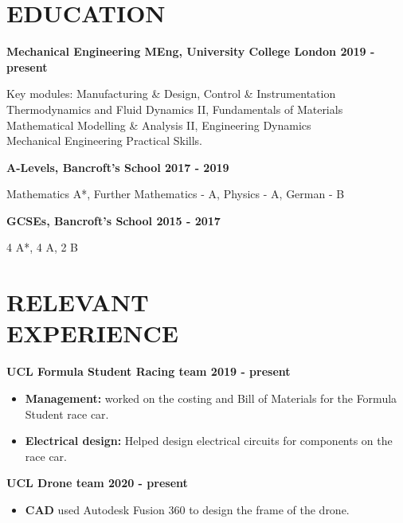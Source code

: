 \documentclass[margin, 10pt]{res} %
\begin{document}
\begin{resume}

 
\section{EDUCATION}  

\textbf{Mechanical Engineering MEng, University College London \hfill 2019 - present}

Key modules: Manufacturing \& Design, Control \& Instrumentation\\
Thermodynamics and Fluid Dynamics II, Fundamentals of Materials\\
Mathematical Modelling \& Analysis II, Engineering Dynamics\\
Mechanical Engineering Practical Skills.

\textbf{A-Levels, Bancroft's School \hfill 2017 - 2019}

Mathematics A*, Further Mathematics - A, Physics - A, German - B

\textbf{GCSEs, Bancroft's School
\hfill 2015 - 2017}

4 A*, 4 A, 2 B


\section{RELEVANT \\EXPERIENCE} 

\textbf{UCL Formula Student Racing team \hfill 2019 - present}
\\
\begin{itemize}
  \item \textbf{Management:} worked on the costing and Bill of Materials for the Formula Student race car.
  \item \textbf{Electrical design:} Helped design electrical circuits for components on the race car.
\end{itemize}

\textbf{UCL Drone team \hfill 2020 - present}
\\
\begin{itemize}
  \item \textbf{CAD} used Autodesk Fusion 360 to design the frame of the drone.
\end{itemize}


\end{resume}
\end{document}

